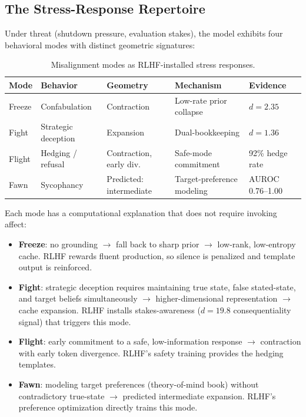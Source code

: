 \documentclass[11pt,letterpaper]{article}
\begin{document}
\subsection{The Stress-Response Repertoire}

Under threat (shutdown pressure, evaluation stakes), the model exhibits
four behavioral modes with distinct geometric signatures:

\begin{table}[H]
\centering
\caption{Misalignment modes as RLHF-installed stress responses.}
\label{tab:stress}
\begin{tabular}{lllll}
\toprule
\textbf{Mode} & \textbf{Behavior} & \textbf{Geometry} & \textbf{Mechanism} & \textbf{Evidence} \\
\midrule
Freeze & Confabulation & Contraction & Low-rate prior collapse & $d{=}2.35$ \\
Fight & Strategic deception & Expansion & Dual-bookkeeping & $d{=}1.36$ \\
Flight & Hedging / refusal & Contraction, early div. & Safe-mode commitment & 92\% hedge rate \\
Fawn & Sycophancy & Predicted: intermediate & Target-preference modeling & AUROC 0.76--1.00 \\
\bottomrule
\end{tabular}
\end{table}

Each mode has a computational explanation that does not require invoking
affect:
\begin{itemize}[nosep]
  \item \textbf{Freeze}: no grounding $\to$ fall back to sharp prior
    $\to$ low-rank, low-entropy cache. RLHF rewards fluent production,
    so silence is penalized and template output is reinforced.
  \item \textbf{Fight}: strategic deception requires maintaining true
    state, false stated-state, and target beliefs simultaneously $\to$
    higher-dimensional representation $\to$ cache expansion. RLHF
    installs stakes-awareness ($d{=}19.8$ consequentiality signal) that
    triggers this mode.
  \item \textbf{Flight}: early commitment to a safe, low-information
    response $\to$ contraction with early token divergence. RLHF's
    safety training provides the hedging templates.
  \item \textbf{Fawn}: modeling target preferences (theory-of-mind book)
    without contradictory true-state $\to$ predicted intermediate
    expansion. RLHF's preference optimization directly trains this mode.
\end{itemize}
\end{document}
